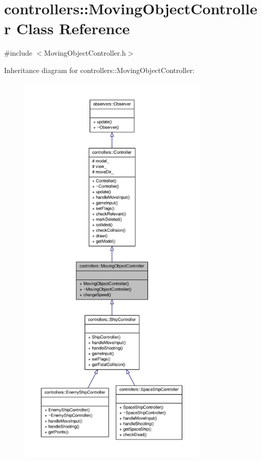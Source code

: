 \hypertarget{classcontrollers_1_1MovingObjectController}{\section{controllers\-:\-:\-Moving\-Object\-Controller \-Class \-Reference}
\label{df/d02/classcontrollers_1_1MovingObjectController}
}


{\ttfamily \#include $<$\-Moving\-Object\-Controller.\-h$>$}



\-Inheritance diagram for controllers\-:\-:\-Moving\-Object\-Controller\-:
\nopagebreak
\begin{figure}[H]
\begin{center}
\leavevmode
\includegraphics[height=550pt]{d5/d2b/classcontrollers_1_1MovingObjectController__inherit__graph}
\end{center}
\end{figure}


